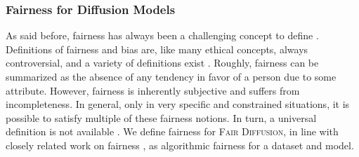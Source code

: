 \documentclass{article}%
\newcommand{\cf}{\emph{cf.}~}
\begin{document}



\subsubsection*{Fairness for Diffusion Models}\label{sec:fairness}
As said before, fairness has always been a challenging concept to define \cite{verma18explained,mehrabi21surveybias}. Definitions of fairness and bias are, like many ethical concepts, always controversial, and a variety of definitions exist \cite{binns17fairphilos,verma18explained,mehrabi21surveybias,Hutchinson19history}.
Roughly, fairness can be summarized as the absence of any tendency in favor of a person due to some attribute. 
However, fairness is inherently subjective and suffers from incompleteness. In general, only in very specific and constrained situations, it is possible to satisfy multiple of these fairness notions. In turn, a universal definition is not available \cite{mehrabi21surveybias,fairness_dignum,culture15fairness, culture22fairness}.
We define fairness for \textsc{Fair Diffusion}, in line with closely related work on fairness \cite{xu18fairgan}, as algorithmic fairness for a dataset and model.
\end{document}
